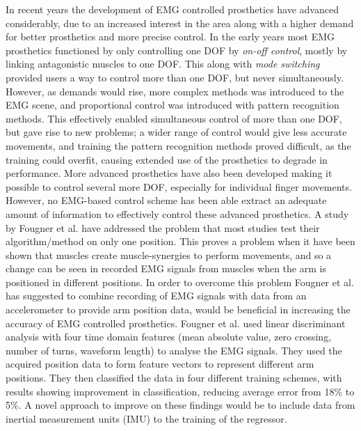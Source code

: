 




In recent years the development of EMG controlled prosthetics have advanced considerably, due to an increased interest in the area along with a higher demand for better prosthetics and more precise control. \cite{Fougner2012} In the early years most EMG prosthetics functioned by only controlling one DOF by \textit{on-off control}, mostly by linking antagonistic muscles to one DOF. This along with \textit{mode switching} provided users a way to control more than one DOF, but never simultaneously. However, as demands would rise, more complex methods was introduced to the EMG scene, and proportional control was introduced with pattern recognition methods. This effectively enabled simultaneous control of more than one DOF, but gave rise to new problems; a wider range of control would give less accurate movements, and training the pattern recognition methods proved difficult, as the training could overfit, causing extended use of the prosthetics to degrade in performance. \cite{Ison2016} More advanced prosthetics have also been developed making it possible to control several more DOF, especially for individual finger movements. However, no EMG-based control scheme has been able extract an adequate amount of information to effectively control these advanced prosthetics. \cite{hahne2014}
A study by Fougner et al. \cite{Fougner2011} have addressed the problem that most studies test their algorithm/method on only one position.
This proves a problem when it have been shown that muscles create muscle-synergies to perform movements, and so a change can be seen in recorded EMG signals from muscles when the arm is positioned in different positions. \cite{avella2006, DeRugy2013, Fougner2011} 
In order to overcome this problem Fougner et al. \cite{Fougner2011} has suggested to combine recording of EMG signals with data from an accelerometer to provide arm position data, would be beneficial in increasing the accuracy of EMG controlled prosthetics. Fougner et al. used linear discriminant analysis with four time domain features (mean absolute value, zero crossing, number of turns, waveform length) to analyse the EMG signals. They used the acquired position data to form feature vectors to represent different arm positions. They then classified the data in four different training schemes, with results showing improvement in classification, reducing average error from 18\% to 5\%. \cite{Fougner2011}
A novel approach to improve on these findings would be to include data from inertial measurement units (IMU) to the training of the regressor. 

